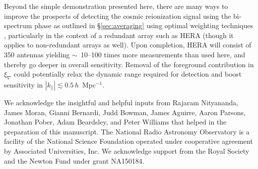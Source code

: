 \documentclass[
reprint,
superscriptaddress,
amsmath,
amssymb,
aps,
prd
]{revtex4-1}
\begin{document}
Beyond the simple demonstration presented here, there are many ways to improve the prospects of detecting the cosmic reionization signal using the bi-spectrum phase as outlined in \S\ref{sec:averaging} using optimal weighting techniques \cite{liu14a,liu14b,dil15}, particularly in the context of a redundant array such as HERA (though it applies to non-redundant arrays as well). Upon completion, HERA will consist of 350 antennas yielding $\sim$~10--100 times more measurements than used here, and thereby go deeper in overall sensitivity. Removal of the foreground contribution in $\xi_\nabla$ could potentially relax the dynamic range required for detection and boost sensitivity in $|k_\parallel| \lesssim 0.5\,h$~Mpc$^{-1}$. 

\begin{acknowledgments}
We acknowledge the insightful and helpful inputs from Rajaram Nityananda, James Moran, Gianni Bernardi, Judd Bowman, James Aguirre, Aaron Parsons, Jonathan Pober, Adam Beardsley, and Peter Williams that helped in the preparation of this manuscript. The National Radio Astronomy Observatory is a facility of the National Science Foundation operated under cooperative agreement by Associated Universities, Inc. We acknowledge support from the Royal Society and the Newton Fund under grant NA150184.
\end{acknowledgments}



\end{document}
